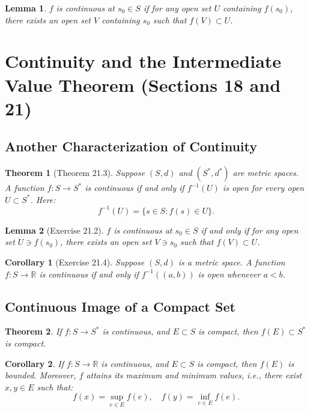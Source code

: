 \documentclass[9pt]{article}
\theoremstyle{definition}
\theoremstyle{plain}
\newtheorem{theorem}{Theorem}
\newtheorem{corollary}{Corollary}
\newtheorem{lemma}{Lemma}
\begin{document}
\begin{lemma}
\( f \) is continuous at \( s_0 \in S \) if for any open set \( U \) containing \( f(s_0) \), there exists an open set \( V \) containing \( s_0 \) such that \( f(V) \subset U \).
\end{lemma}
\section*{Continuity and the Intermediate Value Theorem (Sections 18 and 21)}

\subsection*{Another Characterization of Continuity}
\begin{theorem}[Theorem 21.3]
Suppose \( (S, d) \) and \( (S^*, d^*) \) are metric spaces. A function \( f : S \to S^* \) is continuous if and only if \( f^{-1}(U) \) is open for every open \( U \subset S^* \). Here:
\[
f^{-1}(U) = \{s \in S : f(s) \in U\}.
\]
\end{theorem}

\begin{lemma}[Exercise 21.2]
\( f \) is continuous at \( s_0 \in S \) if and only if for any open set \( U \ni f(s_0) \), there exists an open set \( V \ni s_0 \) such that \( f(V) \subset U \).
\end{lemma}

\begin{corollary}[Exercise 21.4]
Suppose \( (S, d) \) is a metric space. A function \( f : S \to \mathbb{R} \) is continuous if and only if \( f^{-1}((a, b)) \) is open whenever \( a < b \).
\end{corollary}

\subsection*{Continuous Image of a Compact Set}
\begin{theorem}
If \( f : S \to S^* \) is continuous, and \( E \subset S \) is compact, then \( f(E) \subset S^* \) is compact.
\end{theorem}

\begin{corollary}
If \( f : S \to \mathbb{R} \) is continuous, and \( E \subset S \) is compact, then \( f(E) \) is bounded. Moreover, \( f \) attains its maximum and minimum values, i.e., there exist \( x, y \in E \) such that:
\[
f(x) = \sup_{e \in E} f(e), \quad f(y) = \inf_{e \in E} f(e).
\]
\end{corollary}
\end{document}

